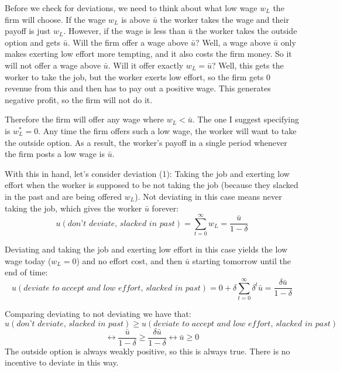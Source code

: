 \documentclass[14pt]{article}
\begin{document}
Before we check for deviations, we need to think about what low wage $w_L$ the firm will choose. If the wage $w_L$ is above $\bar u$ the worker takes the wage and their payoff is just $w_L$. However, if the wage is less than $\bar u$ the worker takes the outside option and gets $\bar u$. Will the firm offer a wage above $\bar u$? Well, a wage above $\bar u$ only makes exerting low effort more tempting, and it also costs the firm money. So it will not offer a wage above $\bar u$. Will it offer exactly $w_L=\bar u$? Well, this gets the worker to take the job, but the worker exerts low effort, so the firm gets $0$ revenue from this and then has to pay out a positive wage. This generates negative profit, so the firm will not do it. 

Therefore the firm will offer any wage where $w_L<\bar u$. The one I suggest specifying is $w_L^*=0$. Any time the firm offers such a low wage, the worker will want to take the outside option. As a result, the worker's payoff in a single period whenever the firm posts a low wage is $\bar u$. 

 With this in hand, let's consider deviation (1): Taking the job and exerting low effort when the worker is supposed to be not taking the job (because they slacked in the past and are being offered $w_L$). Not deviating in this case means never taking the job, which gives the worker $\bar u$ forever: 
\[u(\textit{don't deviate, slacked in past})=\sum_{t=0}^\infty w_L=\frac{\bar u}{1-\delta}\]

Deviating and taking the job and exerting low effort in this case yields the low wage today ($w_L=0$) and no effort cost, and then $\bar u$ starting tomorrow until the end of time:
 \[u(\textit{deviate to accept and low effort, slacked in past}) =  0+\delta \sum_{t=0}^\infty \delta^t \bar u=   \frac{\delta \bar u}{1-\delta}\]

Comparing deviating to not deviating we have that:
   \[u(\textit{don't deviate, slacked in past})  \geq u(\textit{deviate to accept and low effort, slacked in past}) \]
   \[\leftrightarrow \frac{\bar u}{1-\delta} \geq \frac{\delta \bar u}{1-\delta} \leftrightarrow  \bar u \geq 0 \]
The outside option is always weakly positive, so this is always true. There is no incentive to deviate in this way. 
\end{document}
